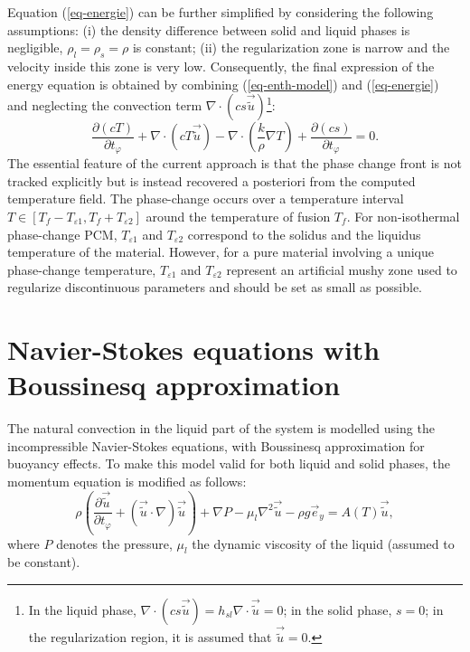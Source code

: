 Equation (\ref{eq-energie}) can be further simplified by considering the following assumptions: (i) the density difference between solid and liquid phases is negligible, \ie $\rho_l=\rho_s=\rho$ is constant; (ii) the regularization zone is narrow and the velocity inside this zone is very low. 
Consequently, the final expression of the energy equation is obtained by combining (\ref{eq-enth-model})  and (\ref{eq-energie}) and  neglecting the convection term $\nabla \cdot ( c s \vec{\tilde{u}})$\footnote{In the liquid phase, $\nabla \cdot ( c s \vec{\tilde{u}})  = h_{sl} \nabla \cdot  \vec{\tilde{u}}=0$; in the solid phase, $s=0$; in the regularization region, it is assumed that $\vec{\tilde{u}}=0.$}:
\begin{equation}\label{eq-energie-enth-model}
\frac{\partial \left(c T\right)}{\partial t_{\varphi}} + \nabla \cdot\left( c T \vec{\tilde{u}}\right) -
\nabla \cdot\left( \frac{k}{\rho} \nabla T \right) +  \frac{\partial \left(c s\right)}{\partial t_{\varphi}}  = 0.
\end{equation}
The essential feature of the current approach is that the phase change front is not tracked explicitly but is instead recovered a posteriori from the computed temperature field.
The phase-change occurs over a temperature interval $  T \in [T_f - T_{\varepsilon1}, T_f + T_{\varepsilon2}] $ around the temperature of fusion $T_f$.
For non-isothermal phase-change PCM, $T_{\varepsilon1}$ and $T_{\varepsilon2}$ correspond to the solidus and the liquidus temperature of the material.
However, for a pure material involving a unique phase-change temperature, $T_{\varepsilon1}$ and $T_{\varepsilon2}$ represent an artificial mushy zone used to regularize discontinuous parameters and should be set as small as possible.

\section{Navier-Stokes equations with Boussinesq approximation}
 

The natural convection in the liquid part of the system is modelled using the incompressible Navier-Stokes equations, with  Boussinesq approximation for buoyancy effects. To make this model valid for both liquid and solid phases, the momentum equation is modified as follows:
\begin{equation}\label{eq-momentum-conserv-1}
  \rho \left( \frac{\partial \vec{\tilde{u}}}{\partial t_{\varphi}} +   {(\vec{\tilde{u}}\cdot\nabla ) \vec{\tilde{u}}} \right) + \nabla P - \mu_{l}  {\nabla^2 \vec{\tilde{u}}} 
- \rho g \vec{e}_y= A(T) \vec{\tilde{u}},
\end{equation}
where $P$ denotes the pressure, $\mu_{l}$ the dynamic viscosity of the liquid (assumed to be constant).  


